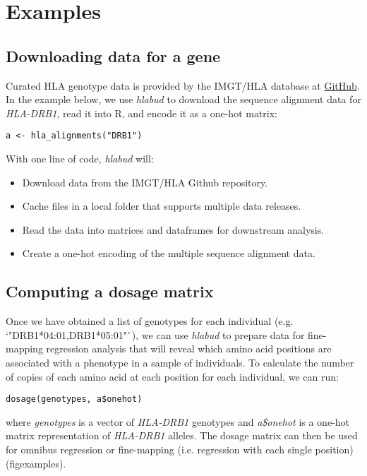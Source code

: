 \section{Examples} \label{examples}

\subsection{Downloading data for a gene}

Curated HLA genotype data is provided by the IMGT/HLA database at \href{https://github.com/ANHIG/IMGTHLA}{GitHub}.
In the example below, we use \textit{hlabud} to download the sequence alignment data for \textit{HLA-DRB1}, read it into R, and encode it as a one-hot matrix:

\begin{verbatim}
a <- hla_alignments("DRB1")    
\end{verbatim}


With one line of code, \textit{hlabud} will:

\begin{itemize}
    \item Download data from the IMGT/HLA Github repository.
    \item Cache files in a local folder that supports multiple data releases.
    \item Read the data into matrices and dataframes for downstream analysis.
    \item Create a one-hot encoding of the multiple sequence alignment data.
\end{itemize}

\subsection{Computing a dosage matrix}

Once we have obtained a list of genotypes for each individual (e.g. `"DRB1*04:01,DRB1*05:01"`), we can use \textit{hlabud} to prepare data for fine-mapping regression analysis that will reveal which amino acid positions are associated with a phenotype in a sample of individuals. To calculate the number of copies of each amino acid at each position for each individual, we can run:

\begin{verbatim}
dosage(genotypes, a$onehot)
\end{verbatim}

where \textit{genotypes} is a vector of \textit{HLA-DRB1} genotypes and \textit{a\$onehot} is a one-hot matrix representation of \textit{HLA-DRB1} alleles.
The dosage matrix can then be used for omnibus regression \cite{Sakaue2023} or fine-mapping (i.e. regression with each single position) (figexamples\A).

